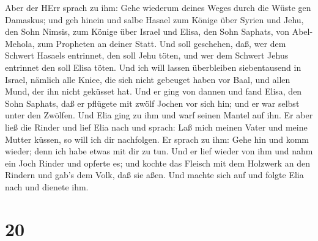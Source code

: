  Aber der HErr sprach zu ihm: Gehe wiederum deines Weges
durch die Wüste gen Damaskus; und geh hinein und salbe Hasael zum Könige
über Syrien  und Jehu, den Sohn Nimsis, zum Könige über
Israel und Elisa, den Sohn Saphats, von Abel-Mehola, zum Propheten an
deiner Statt.  Und soll geschehen, daß, wer dem Schwert
Hasaels entrinnet, den soll Jehu töten, und wer dem Schwert Jehus
entrinnet den soll Elisa töten.  Und ich will lassen
überbleiben siebentausend in Israel, nämlich alle Kniee, die sich nicht
gebeuget haben vor Baal, und allen Mund, der ihn nicht geküsset hat.
 Und er ging von dannen und fand Elisa, den Sohn Saphats,
daß er pflügete mit zwölf Jochen vor sich hin; und er war selbst unter
den Zwölfen. Und Elia ging zu ihm und warf seinen Mantel auf ihn.
 Er aber ließ die Rinder und lief Elia nach und sprach: Laß
mich meinen Vater und meine Mutter küssen, so will ich dir nachfolgen.
Er sprach zu ihm: Gehe hin und komm wieder; denn ich habe etwas mit dir
zu tun.  Und er lief wieder von ihm und nahm ein Joch
Rinder und opferte es; und kochte das Fleisch mit dem Holzwerk an den
Rindern und gab's dem Volk, daß sie aßen. Und machte sich auf und folgte
Elia nach und dienete ihm.

\hypertarget{section-19}{%
\section{20}\label{section-19}}

